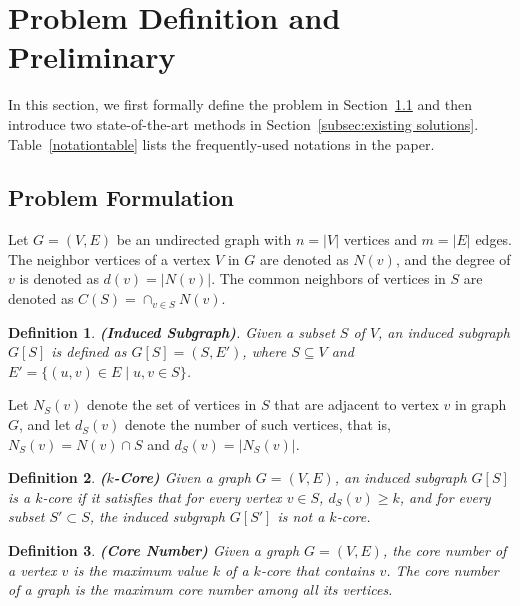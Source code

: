 \documentclass[sigconf, nonacm]{acmart}
\newtheorem{definition}{Definition}%
\begin{document}
\section{Problem Definition and Preliminary}\label{sec2}

In this section, we first formally define the problem in Section~\ref{subsec:problem formulation} and then introduce two state-of-the-art methods in Section~\ref{subsec:existing solutions}. Table~\ref{notationtable} lists the frequently-used notations in the paper.





\subsection{Problem Formulation}\label{subsec:problem formulation}

Let $G = (V,E)$ be an undirected graph with $n=\lvert V \rvert$ vertices and $m=\lvert E\rvert$ edges. The neighbor vertices of a vertex $V$ in $G$ are denoted as $N(v)$, and the degree of $v$ is denoted as $d(v) = \lvert N(v) \rvert$. The common neighbors of vertices in $S$ are denoted as $C(S) = \cap_{v\in S}N(v)$. 



\begin{definition}
\textit{
{\textbf{(Induced Subgraph)}}.
Given a subset $S$ of $V$, an induced subgraph $G[S]$ is defined as $G[S] = (S, E')$, where $S\subseteq V$ and $E' = \{(u, v) \in E \mid u, v \in S\}$.} 
\end{definition}

Let $N_S(v)$ denote the set of vertices in $S$ that are adjacent to vertex $v$ in graph $G$, and let $d_S(v)$ denote the number of such vertices, that is, $N_S(v) = N(v) \cap S$ and $d_S(v) = \lvert N_S(v) \rvert$. %



\begin{definition}
\textit{
{\textbf{($k$-Core)}}
Given a graph $G = (V, E)$, an induced subgraph $G[S]$ is a $k$-core if it satisfies that for every vertex $v \in S$, $d_{S}(v) \geq k$, and for every subset $S'\subset S$, the induced subgraph $G[S']$ is not a $k$-core.
}
\end{definition}

\begin{definition}
\textit{
{\textbf{(Core Number)}}
Given a graph $G = (V, E)$, the core number of a vertex $v$ is the maximum value $k$ of a $k$-core that contains $v$. The core number of a graph is the maximum core number among all its vertices.
}
\end{definition}
\end{document}

